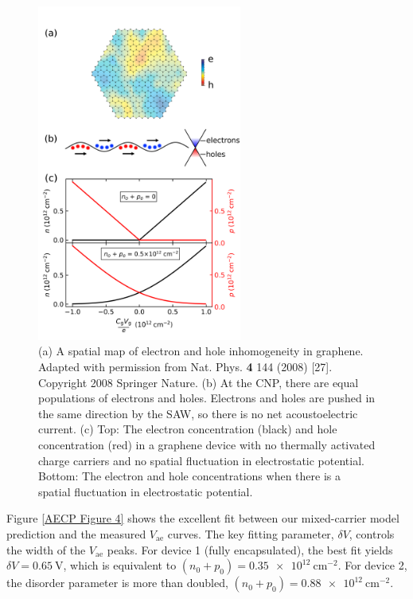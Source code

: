 \documentclass[double,12pt,1in,seploa]{beavtex}
\begin{document}
\begin{figure}
    \includegraphics[width =  0.6\textwidth]{Figure 3 n and p_corrected.png}
    \caption{(a) A spatial map of electron and hole inhomogeneity in graphene. Adapted with permission from Nat. Phys. \textbf{4} 144 (2008) [27]. Copyright 2008 Springer Nature. (b) At the CNP, there are equal populations of electrons and holes. Electrons and holes are pushed in the same direction by the SAW, so there is no net acoustoelectric current. (c) Top: The electron concentration (black) and hole concentration (red) in a graphene device with no thermally activated charge carriers and no spatial fluctuation in electrostatic potential. Bottom: The electron and hole concentrations when there is a spatial fluctuation in electrostatic potential.}
    \label{AECP Figure 3}
\end{figure}

Figure \ref{AECP Figure 4} shows the excellent fit between our mixed-carrier model prediction and the measured $V_{\mathrm{ae}}$ curves. The key fitting parameter, $\delta V$, controls the width of the $V_{\mathrm{ae}}$ peaks.  For device 1 (fully encapsulated), the best fit yields $\delta V = \SI{0.65}{\volt}$, which is equivalent to $(n_0+p_0) = \SI{0.35e12}{\centi\meter^{-2}}$. For device 2, the disorder parameter is more than doubled, $(n_0+p_0) = \SI{0.88e12}{\centi\meter^{-2}}$.
\end{document}
